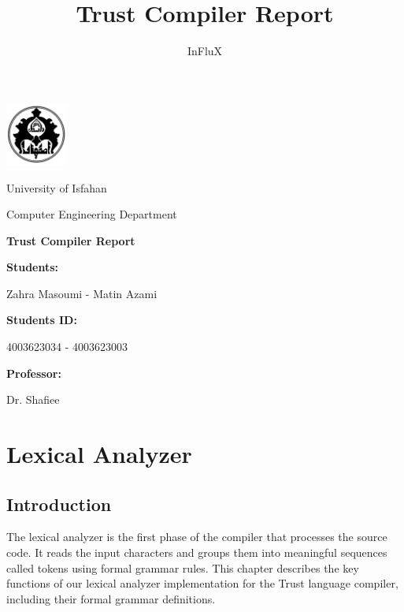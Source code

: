 \documentclass[12pt, a4paper]{report}
\title{Trust Compiler Report}
\author{InFluX}
\begin{document}
\begin{titlepage}
	\centering
	\includegraphics[width=0.15\textwidth]{images/logo.png}
	
	{\Large University of Isfahan}\par
	{\Large Computer Engineering Department}\par\vspace{2cm}
	
	\textbf
	{\Huge Trust Compiler Report}\par\vspace{1.5cm}
	
	\large
	\textbf{Students:}\par{Zahra Masoumi - Matin Azami}\par\vspace{0.5cm}  
	\textbf{Students ID:}\par{4003623034 - 4003623003}\par\vspace{0.5cm}
	\textbf{Professor:}\par{Dr. Shafiee}\par\vspace{0.5cm}
		
	\par\vspace{2cm}
	
	
\end{titlepage}

\tableofcontents


\chapter{Lexical Analyzer}

\section{Introduction}

The lexical analyzer is the first phase of the compiler that processes the source code. It reads the input characters and groups them into meaningful sequences called tokens using formal grammar rules. This chapter describes the key functions of our lexical analyzer implementation for the Trust language compiler, including their formal grammar definitions.
\end{document}
